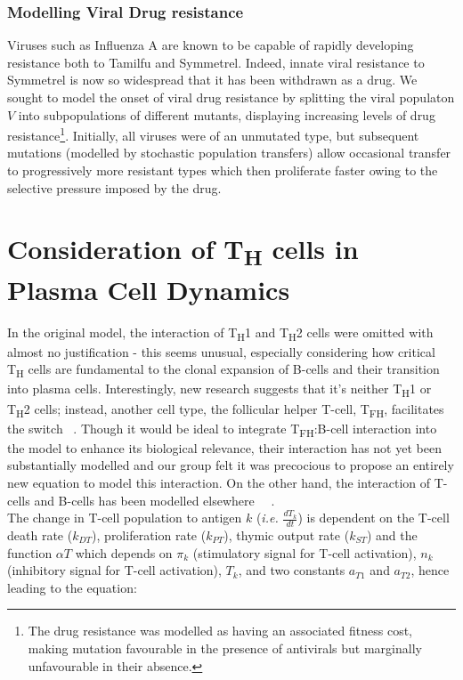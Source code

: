 \documentclass[a4paper, 12pt]{report}
\begin{document}
\subsubsection{Modelling Viral Drug resistance}

Viruses such as Influenza A are known to be capable of rapidly developing resistance both to Tamilfu and Symmetrel.
Indeed, innate viral resistance to Symmetrel is now so widespread that it has been withdrawn as a drug.
We sought to model the onset of viral drug resistance by splitting the viral populaton $V$ into subpopulations of different mutants, displaying increasing levels of drug resistance\footnote{The drug resistance was modelled as having an associated fitness cost, making mutation favourable in the presence of antivirals but marginally unfavourable in their absence.}. Initially, all viruses were of an unmutated type, but subsequent mutations (modelled by stochastic population transfers) allow occasional transfer to progressively more resistant types which then proliferate faster owing to the selective pressure imposed by the drug.

\section{Consideration of T\textsubscript{H} cells in Plasma Cell Dynamics} %
In the original model, the interaction of T\textsubscript{H}1 and T\textsubscript{H}2 cells were omitted with almost no justification - this seems unusual, especially considering how critical T\textsubscript{H} cells are fundamental to the clonal expansion of B-cells and their transition into plasma cells. Interestingly, new research suggests that it's neither T\textsubscript{H}1 or T\textsubscript{H}2 cells; instead, another cell type, the follicular helper T-cell, T\textsubscript{FH}, facilitates the switch ~\cite{Swain}. Though it would be ideal to integrate T\textsubscript{FH}:B-cell interaction into the model to enhance its biological relevance, their interaction has not yet been substantially modelled and our group felt it was precocious to propose an entirely new equation to model this interaction. On the other hand, the interaction of T-cells and B-cells has been modelled elsewhere ~\cite{Carneiro1}~\cite{Carneiro2}.\\ 

The change in T-cell population to antigen $k$ (\emph{i.e.} $\frac{dT_k}{dt}$) is dependent on the T-cell death rate ($k_{DT}$), proliferation rate ($k_{PT}$), thymic output rate ($k_{ST}$) and the function $\alpha{T}$ which depends on $\pi_{k}$ (stimulatory signal for T-cell activation), $n_{k}$ (inhibitory signal for T-cell activation), $T_{k}$, and two constants $a_{T1}$ and $a_{T2}$, hence leading to the equation:
\end{document}
